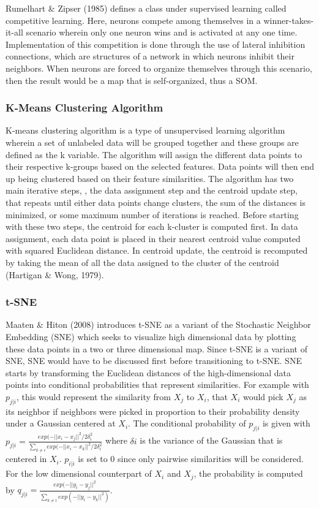 Rumelhart \& Zipser (1985) defines a class under supervised learning called competitive learning. Here, neurons compete among themselves in a winner-takes-it-all scenario wherein only one neuron wins and is activated at any one time. Implementation of this competition is done through the use of lateral inhibition connections, which are structures of a network in which neurons inhibit their neighbors. When neurons are forced to organize themselves through this scenario, then the result would be a map that is self-organized, thus a SOM.

\subsubsection{K-Means Clustering Algorithm}

K-means clustering algorithm is a type of unsupervised learning algorithm wherein a set of unlabeled data will be grouped together and these groups are defined as the k variable. The algorithm will assign the different data points to their respective k-groups based on the selected features. Data points will then end up being clustered based on their feature similarities. The algorithm has two main iterative steps, , the data assignment step and the centroid update step, that repeats until either data points change clusters, the sum of the distances is minimized, or some maximum number of iterations is reached. Before starting with these two steps, the centroid for each k-cluster is computed first. In data assignment, each data point is placed in their nearest centroid value computed with squared Euclidean distance. In centroid update, the centroid is recomputed by taking the mean of all the data assigned to the cluster of the centroid (Hartigan \& Wong, 1979).

\subsubsection{t-SNE}

Maaten \& Hiton (2008) introduces t-SNE as a variant of the Stochastic Neighbor Embedding (SNE) which seeks to visualize high dimensional data by plotting these data points in a two or three dimensional map. Since t-SNE is a variant of SNE, SNE would have to be discussed first before transitioning to t-SNE. SNE starts by transforming the Euclidean distances of the high-dimensional data points into conditional probabilities that represent similarities. For example with $p_{j|i}$, this would represent the similarity from $X_j$ to $X_i$, that $X_i$ would pick $X_j$ as its neighbor if neighbors were picked in proportion to their probability density under a Gaussian centered at $X_i$. The conditional probability of $p_{j|i}$ is given with $p_{j|i} = \frac{exp(-||x_i-x_j||^2 /2 \delta_i^2}{\sum_{k \neq i} exp(-||x_i - x_k||^2 / 2 \delta_i^2}$ where $\delta i$ is the variance of the Gaussian that is centered in $X_i$. $p_{i|i}$ is set to 0 since only pairwise similarities will be considered. For the low dimensional counterpart of $X_i$ and $X_j$, the probability is computed by $q_{j|i} = \frac{exp(-||y_i - y_j||^2}{\sum_{k \neq i} exp(-||y_i - y_k||^2)}$.

